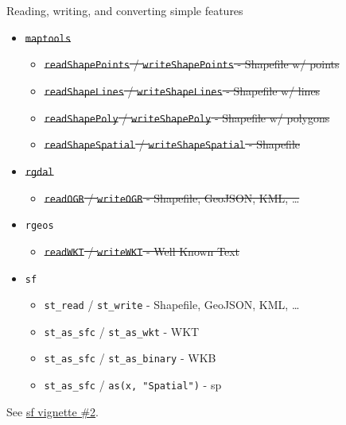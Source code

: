 \documentclass[11pt,ignorenonframetext,]{beamer}
\providecommand{\tightlist}{%
  \setlength{\itemsep}{0pt}\setlength{\parskip}{0pt}}
\begin{document}
\begin{frame}[fragile,t]{Reading, writing, and converting simple
features}
\protect\hypertarget{reading-writing-and-converting-simple-features}{}

\begin{itemize}
\tightlist
\item
  \sout{\texttt{maptools}}

  \begin{itemize}
  \tightlist
  \item
    \sout{\texttt{readShapePoints} / \texttt{writeShapePoints} -
    Shapefile w/ points}
  \item
    \sout{\texttt{readShapeLines} / \texttt{writeShapeLines} - Shapefile
    w/ lines}
  \item
    \sout{\texttt{readShapePoly} / \texttt{writeShapePoly} - Shapefile
    w/ polygons}
  \item
    \sout{\texttt{readShapeSpatial} / \texttt{writeShapeSpatial} -
    Shapefile}
  \end{itemize}
\item
  \sout{\texttt{rgdal}}

  \begin{itemize}
  \tightlist
  \item
    \sout{\texttt{readOGR} / \texttt{writeOGR} - Shapefile, GeoJSON,
    KML, \ldots{}}
  \end{itemize}
\item
  \texttt{rgeos}

  \begin{itemize}
  \tightlist
  \item
    \sout{\texttt{readWKT} / \texttt{writeWKT} - Well Known Text}
  \end{itemize}
\item
  \texttt{sf}

  \begin{itemize}
  \tightlist
  \item
    \texttt{st\_read} / \texttt{st\_write} - Shapefile, GeoJSON, KML,
    \ldots{}
  \item
    \texttt{st\_as\_sfc} / \texttt{st\_as\_wkt} - WKT
  \item
    \texttt{st\_as\_sfc} / \texttt{st\_as\_binary} - WKB
  \item
    \texttt{st\_as\_sfc} / \texttt{as(x,\ "Spatial")} - sp
  \end{itemize}
\end{itemize}

See
\href{https://cran.r-project.org/web/packages/sf/vignettes/sf2.html}{sf
vignette \#2}.

\end{frame}
\end{document}
